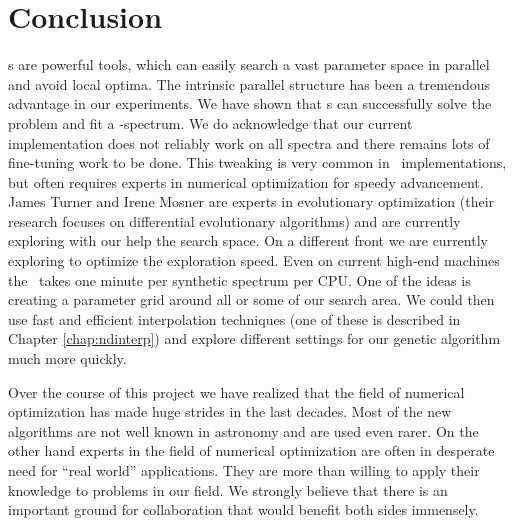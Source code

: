 \section{Conclusion}
\label{sec:dalek_conclusion}
\ga s are powerful tools, which can easily search a vast parameter space in parallel and avoid local optima. The intrinsic parallel structure has been a tremendous advantage in our experiments. We have shown that \ga s can successfully solve the problem and fit a \sneia-spectrum. We do acknowledge that our current implementation does not reliably work on all spectra and there remains lots of fine-tuning work to be done. This tweaking is very common in \ga\ implementations, but often requires experts in numerical optimization for speedy advancement. James Turner and Irene Mosner are experts in evolutionary optimization (their research focuses on differential evolutionary algorithms) and are currently exploring with our help the search space. 
On a different front we are currently exploring to optimize the exploration speed. Even on current high-end machines the \mlc\ takes one minute per synthetic spectrum per CPU. One of the ideas is creating a parameter grid around all or some of our search area. We could then use fast and efficient interpolation techniques (one of these is described in Chapter \ref{chap:ndinterp}) and explore different settings for our genetic algorithm much more quickly.

Over the course of this project we have realized that the field of numerical optimization has made huge strides in the last decades. Most of the new algorithms are not well known in astronomy and are used even rarer. On the other hand experts in the field of numerical optimization are often in desperate need for ``real world'' applications. They are more than willing to apply their knowledge to problems in our field. We strongly believe that there is an important ground for collaboration that would benefit both sides immensely.





